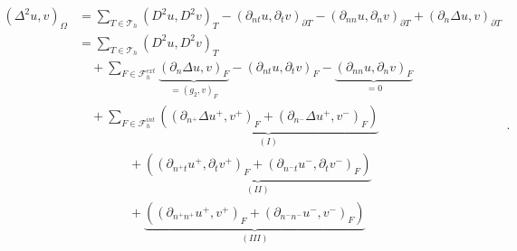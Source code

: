 \begin{equation*}
    \begin{split}
 \left( \Delta  ^{2} u,v \right) _{\Omega } & =\sum_{T\in \mathcal{T} _{h}}^{} \left( D^2u,D^2v \right) _{T } - \left(\partial _{nt} u, \partial _{t}v
\right)_{\partial T} - \left(\partial _{nn} u, \partial _{n}v \right)_{\partial T} + \left(\partial _{n} \Delta  u,v
\right)_{\partial T} \\
&= \sum_{T\in \mathcal{T} _{h}}^{} \left( D^2u,D^2v \right) _{T } \\
&  \quad + \sum_{F \in \mathcal{F}_{h}^{ext} }^{} \underbrace{\left( \partial _{n} \Delta  u, v  \right)_{F}}_{= \left( g_{2},v \right)_{F} }  -  \left(
\partial _{nt} u, \partial _{t} v \right) _{F}  - \underbrace{\left( \partial _{nn} u, \partial _{n} v \right)_{F}}_{ = 0}    \\
& \quad  + \sum_{F \in \mathcal{F} _{h}^{int}}^{} \underbrace{\left( \left(\partial _{n^{+}} \Delta  u^{+}
        ,v^{+}\right)_{F}
+ \left(\partial _{n^{-}} \Delta  u^{+} ,v^{-}\right)_{F}  \right)}_{(I)} \\
 & \quad \quad \quad  \quad +
\underbrace{\left( \left(\partial _{n^{+}t} u^{+}, \partial_{t} v^{+} \right)_{F} +  \left(\partial _{n^{-}t} u^{-},
        \partial_{t} v^{-}
\right)_{F}  \right) }_{(II)} \\
 & \quad \quad \quad  \quad  +
\underbrace{\left( \left(\partial _{n^{+}n^{+}} u^{+}, v^{+} \right) _{F} + \left(\partial _{n^{-}n^{-}} u^{-}, v^{-}
\right) _{F} \right) }_{(III)}
    \end{split}
.\end{equation*}

